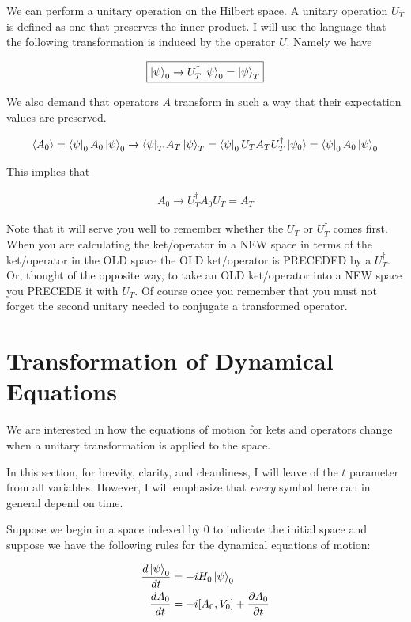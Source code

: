 \documentclass[12pt]{article}
\newcommand{\ddt}[1]{\frac{d #1}{dt}}
\begin{document}
We can perform a unitary operation on the Hilbert space. A unitary operation $U_T$ is defined as one that preserves the inner product. I will use the language that the following transformation is induced by the operator $U$. Namely we have

\begin{align}
\boxed{\ket{\psi}_0 \rightarrow U_T^{\dag}\ket{\psi}_0 = \ket{\psi}_T}
\end{align}

We also demand that operators $A$ transform in such a way that their expectation values are preserved.

\begin{align}
\braket{A_0} = \bra{\psi}_0 A_0\ket{\psi}_0 \rightarrow \bra{\psi}_T A_T \ket{\psi}_T = \bra{\psi}_0 U_T A_T U_T^{\dag}\ket{\psi_0} =  \bra{\psi}_0 A_0 \ket{\psi}_0
\end{align}

This implies that

\begin{align}
\boxed{A_0 \rightarrow U_T^{\dag} A_0 U_T = A_T}
\end{align}

Note that it will serve you well to remember whether the $U_T$ or $U_T^{\dag}$ comes first. When you are calculating the ket/operator in a NEW space in terms of the ket/operator in the OLD space the OLD ket/operator is PRECEDED by a $U_T^{\dag}$. Or, thought of the opposite way, to take an OLD ket/operator into a NEW space you PRECEDE it with $U_T$. Of course once you remember that you must not forget the second unitary needed to conjugate a transformed operator.

\section{Transformation of Dynamical Equations}

We are interested in how the equations of motion for kets and operators change when a unitary transformation is applied to the space. 

In this section, for brevity, clarity, and cleanliness, I will leave of the $t$ parameter from all variables. However, I will emphasize that \emph{every} symbol here can in general depend on time.

Suppose we begin in a space indexed by $0$ to indicate the initial space and suppose we have the following rules for the dynamical equations of motion:

\begin{align}
\ddt{\ket{\psi}_0} &= -i H_0 \ket{\psi}_0\\
\ddt{A_0} &= -i[A_0,V_0] + \frac{\partial A_0}{\partial t}
\end{align}
\end{document}
